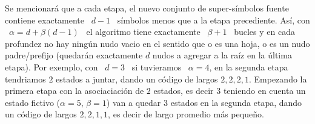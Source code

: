 %
Se mencionar\'a que  a cada etapa, el nuevo  conjunto de super-s\'imbolos fuente
contiene   exactamente   \  $d-1$   \   s\'imbolos   menos   que  a   la   etapa
precediente.  As\'i, con  \ $\alpha  = d  + \beta  (d-1)$ \  el  algoritmo tiene
exactamente \ $\beta+1$ \ bucles y  en cada profundez no hay ning\'un nudo vacio
en  el sentido  que  o  es una  hoja,  o es  un  nudo padre/prefijo  (quedar\'an
exactamente $d$ nudos a agregar a la ra\'iz en la \'ultima etapa).  Por exemplo,
con \ $d = 3$ \ si tuvieramos \ $\alpha = 4$, en la segunda etapa tendriamos $2$
estados  a juntar,  dando un  c\'odigo de  largos $2,  2, 2,  1$.   Empezando la
primera etapa  con la asociaciaci\'on de  $2$ estados, es decir  $3$ teniendo en
cuenta un estado fictivo  ($\alpha = 5$, $\beta = 1$) van  a quedar 3 estados en
la segunda etapa,  dando un c\'odigo de largos  $2, 2, 1, 1$, es  decir de largo
promedio m\'as peque\~no.

